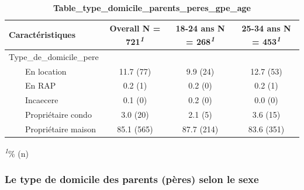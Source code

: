 \documentclass[
]{article}
\begin{document}
\begin{table}[!t]
\caption{\label{tab:unnamed-chunk-38}\textbf{Table\_type\_domicile\_parents\_peres\_gpe\_age}} 
\fontsize{12.0pt}{14.4pt}\selectfont
\begin{tabular*}{\linewidth}{@{\extracolsep{\fill}}lccc}
\toprule
\textbf{Caractéristiques} & \textbf{Overall}  N = 721\textsuperscript{\textit{1}} & \textbf{18-24 ans}  N = 268\textsuperscript{\textit{1}} & \textbf{25-34 ans}  N = 453\textsuperscript{\textit{1}} \\ 
\midrule\addlinespace[2.5pt]
Type\_de\_domicile\_pere &  &  &  \\ 
    En location & 11.7 (77) & 9.9 (24) & 12.7 (53) \\ 
    En RAP & 0.2 (1) & 0.2 (0) & 0.2 (1) \\ 
    Incaecere & 0.1 (0) & 0.2 (0) & 0.0 (0) \\ 
    Propriétaire condo & 3.0 (20) & 2.1 (5) & 3.6 (15) \\ 
    Propriétaire maison & 85.1 (565) & 87.7 (214) & 83.6 (351) \\ 
\bottomrule
\end{tabular*}
\begin{minipage}{\linewidth}
\textsuperscript{\textit{1}}\% (n)\\
\end{minipage}
\end{table}
\vspace{2cm}

\hypertarget{le-type-de-domicile-des-parents-puxe8res-selon-le-sexe}{%
\subsubsection{Le type de domicile des parents (pères) selon le
sexe}\label{le-type-de-domicile-des-parents-puxe8res-selon-le-sexe}}
\end{document}
